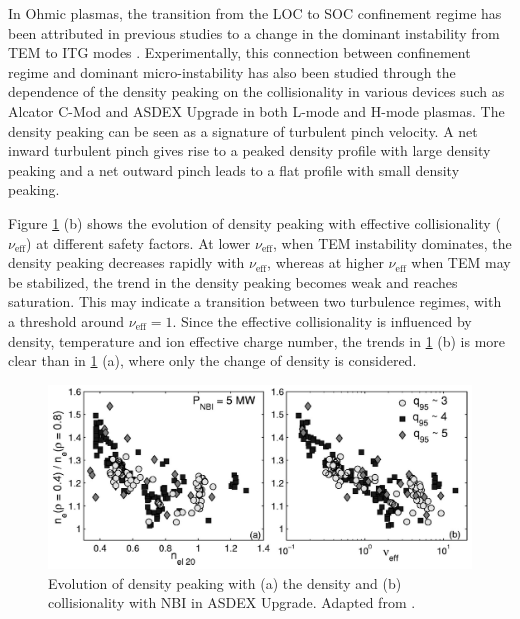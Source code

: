 In Ohmic plasmas, the transition from the LOC to SOC confinement regime has been attributed in previous studies to a change in the dominant instability from TEM to ITG modes \cite{Angioni_PoP_2005_LOCSOC_TEMITG,Erofeev_2017_NF}. Experimentally, this connection between confinement regime and dominant micro-instability has also been studied through the dependence of the density peaking on the collisionality in various devices such as Alcator C-Mod and ASDEX Upgrade \cite{Rice_2012_PoP,Lebschy_2018_NF} in both L-mode and H-mode plasmas. The density peaking can be seen as a signature of turbulent pinch velocity. A net inward turbulent pinch gives rise to a peaked density profile with large density peaking and a net outward pinch leads to a flat profile with small density peaking. %


Figure \ref{fig:turb_nu_eff} (b) shows the evolution of density peaking with effective collisionality ($\nu_\mathrm{eff}$) at different safety factors. At lower $\nu_\mathrm{eff}$, when TEM instability dominates, the density peaking decreases rapidly with $\nu_\mathrm{eff}$, whereas at higher $\nu_\mathrm{eff}$ when TEM may be stabilized, the trend in the density peaking becomes weak and reaches saturation. This may indicate a transition between two turbulence regimes, with a threshold around $\nu_\mathrm{eff} = 1$. Since the effective collisionality is influenced by density, temperature and ion effective charge number, the trends in \ref{fig:turb_nu_eff} (b) is more clear than in \ref{fig:turb_nu_eff} (a), where only the change of density is considered.


\begin{figure}[h]
\begin{centering}
\includegraphics[scale=0.45]{nu_eff.png}
\par\end{centering}
\caption{Evolution of density peaking with (a) the density and (b) collisionality with NBI in ASDEX Upgrade. Adapted from \cite{Angioni_2003_PoP}.}\label{fig:turb_nu_eff}
\end{figure}


